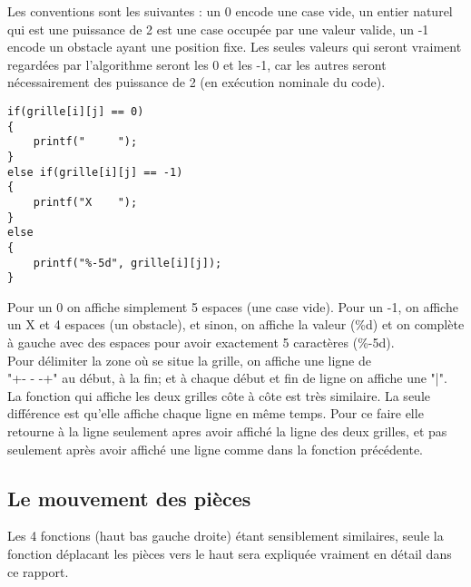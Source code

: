 \documentclass[12pt]{article}
\begin{document}
\indent Les conventions sont les suivantes : un 0 encode une case vide, un entier naturel qui est une puissance de 2 est une case occupée par une valeur valide, un -1 encode un obstacle ayant une position fixe. Les seules valeurs qui seront vraiment regardées par l'algorithme seront les 0 et les -1, car les autres seront nécessairement des puissance de 2 (en exécution nominale du code).
\begin{lstlisting}[style=mystyle, caption={code pour afficher une grille}]
if(grille[i][j] == 0)
{
    printf("     ");
}
else if(grille[i][j] == -1)
{
    printf("X    ");
}
else
{
    printf("%-5d", grille[i][j]);
}
\end{lstlisting}
\indent Pour un 0 on affiche simplement 5 espaces (une case vide). Pour un -1, on affiche un X et 4 espaces (un obstacle), et sinon, on affiche la valeur (\%d) et on complète à gauche avec des espaces pour avoir exactement 5 caractères (\%-5d).\\
Pour délimiter la zone où se situe la grille, on affiche une ligne de \\
"+- - -+" au début, à la fin; et à chaque début et fin de ligne on affiche une "|".\\
\indent La fonction qui affiche les deux grilles côte à côte est très similaire. La seule différence est qu'elle affiche chaque ligne en même temps. Pour ce faire elle retourne à la ligne seulement apres avoir affiché la ligne des deux grilles, et pas seulement après avoir affiché une ligne comme dans la fonction précédente.

\newpage
\subsection{Le mouvement des pièces}

\indent Les 4 fonctions (haut bas gauche droite) étant sensiblement similaires, seule la fonction déplacant les pièces vers le haut sera expliquée vraiment en détail dans ce rapport.
\end{document}
